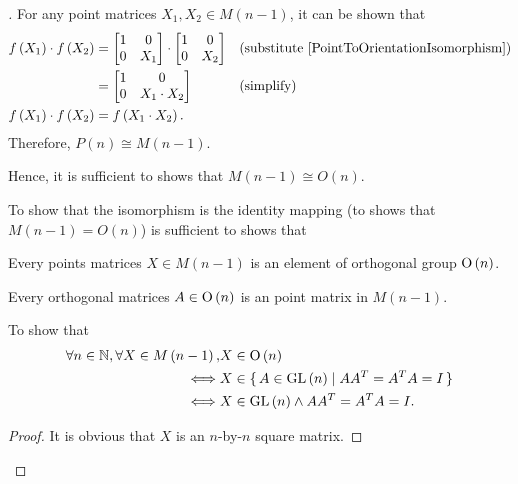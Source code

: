 \documentclass[stu, babel, american, biblatex, a4paper, draftall]{apa7}
\begin{document}
\begin{proof}[]
    For any point matrices $X_1, X_2 \in M\left(n-1\right)$, it can be shown that
    \begin{align}
        f\left(X_1\right)\cdot f\left(X_2\right)
                                                 & =\begin{bmatrix}
            1 & 0   \\
            0 & X_1 \\
        \end{bmatrix}\cdot\begin{bmatrix}
            1 & 0   \\
            0 & X_2 \\
        \end{bmatrix}                         &  & \text{(substitute \cref{PointToOrientationIsomorphism})} \nonumber \\
                                                 & =\begin{bmatrix}
            1 & 0            \\
            0 & X_1\cdot X_2 \\
        \end{bmatrix}                                                        &  & \text{(simplify)} \nonumber                                        \\
        f\left(X_1\right)\cdot f\left(X_2\right) & = f\left(X_1\cdot X_2\right)\text{.} \label{PointToOrientationIsomorphismProperty}
    \end{align}
    Therefore, $P\left(n\right)\cong M\left(n-1\right)$.

    Hence, it is sufficient to shows that $M\left(n-1\right)\cong O\left(n\right)$.

    To show that the isomorphism is the identity mapping
    (to shows that $M\left(n-1\right)=O\left(n\right)$)
    is sufficient to shows that
    \begin{APAenumerate}
        \item Every points matrices $X \in M\left(n-1\right)$ is an element of orthogonal group $\operatorname{O}\left(n\right)$.
        \item Every orthogonal matrices $A \in \operatorname{O}\left(n\right)$ is an point matrix in $M\left(n-1\right)$.
    \end{APAenumerate}

    To show that
    \begin{align*}
        \forall n\in\mathbb{N}, \forall X\in M\left(n-1\right),
             & X\in \operatorname{O}\left(n\right)                                  \\
        \iff & X\in \set{A\in\operatorname{GL}\left(n\right)\mid A A^T = A^T A = I} \\
        \iff & X\in\operatorname{GL}\left(n\right) \wedge A A^T = A^T A = I\text{.}
    \end{align*}
    \begin{proof}
        It is obvious that $X$ is an $n$-by-$n$ square matrix.


\end{proof}
\end{proof}
\end{document}
